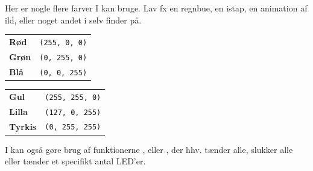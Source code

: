 \documentclass{ucph-handout}
\begin{document}
\begin{exercisebox}[adjusted title=Flere farver]
  \vspace{-2mm}
  Her er nogle flere farver I kan bruge. Lav fx en regnbue, en istap, en
  animation af ild, eller noget andet i selv finder på.
  \hfill \\
  \begin{minipage}{0.45\linewidth}
    \begin{tabular}{ll}
    \textbf{Rød} & \lstinline[style=mypython]$(255, 0, 0)$ \\
    \textbf{Grøn} & \lstinline[style=mypython]$(0, 255, 0)$ \\
    \textbf{Blå} & \lstinline[style=mypython]$(0, 0, 255)$ \\
    \end{tabular}
  \end{minipage}
  \begin{minipage}{0.45\linewidth}
    \begin{tabular}{ll}
    \textbf{Gul} & \lstinline[style=mypython]$(255, 255, 0)$ \\
   \textbf{Lilla} & \lstinline[style=mypython]$(127, 0, 255)$ \\
    \textbf{Tyrkis} & \lstinline[style=mypython]$(0, 255, 255)$ \\
    \end{tabular}
  \end{minipage}

  I kan også gøre brug af funktionerne
  ,  eller
  , der hhv. tænder alle, slukker
  alle eller tænder et specifikt antal LED'er.
\end{exercisebox}

\end{document}
